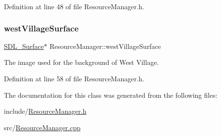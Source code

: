 Definition at line 48 of file Resource\+Manager.\+h.

\mbox{\label{class_resource_manager_ab31bfc864d9e4972909db9d0064c1835}} 
\subsubsection{\texorpdfstring{westVillageSurface}{westVillageSurface}}
{\footnotesize\ttfamily \mbox{\hyperlink{struct_s_d_l___surface}{S\+D\+L\+\_\+\+Surface}}$\ast$ Resource\+Manager\+::west\+Village\+Surface}



The image used for the background of West Village. 



Definition at line 58 of file Resource\+Manager.\+h.



The documentation for this class was generated from the following files\+:\begin{DoxyCompactItemize}
\item 
include/\mbox{\hyperlink{_resource_manager_8h}{Resource\+Manager.\+h}}\item 
src/\mbox{\hyperlink{_resource_manager_8cpp}{Resource\+Manager.\+cpp}}\end{DoxyCompactItemize}
